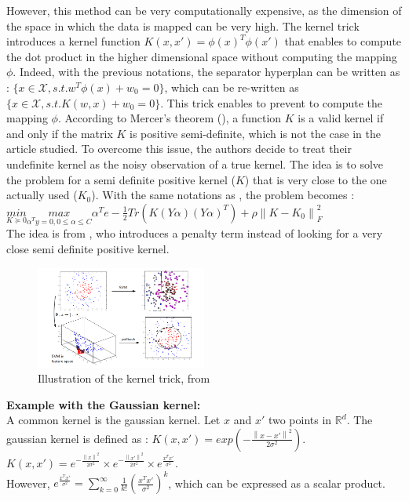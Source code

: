 \documentclass[a4paper,11pt]{article}
\begin{document}
However, this method can be very computationally expensive, as the dimension of the space in which the data is mapped can be very high.
The kernel trick introduces a kernel function $K(x, x') = \phi(x)^T \phi(x')$ that enables to compute the dot product in the higher dimensional space without computing the mapping $\phi$.
Indeed, with the previous notations, the separator hyperplan can be written as : $\{ x \in \mathcal{X}, s.t. w^T \phi(x) + w_0 =0  \} $, which can be re-written as $\{ x \in \mathcal{X}, s.t.  K(w, x) + w_0 = 0 \}$. 
This trick enables to prevent to compute the mapping $\phi$. 
According to Mercer's theorem (\cite{mercer1909xvi}), a function $K$ is a valid kernel if and only if the matrix $K$ is positive semi-definite, which is not the case in the article studied. 
To overcome this issue, the authors decide to treat their undefinite kernel as the noisy observation of a true kernel. 
The idea is to solve the problem for a semi definite positive kernel ($K$) that is very close to the one actually used ($K_0$).
With the same notations as \cite{lanckriet2004learning}, the problem becomes : \\

$  \underset{K \succeq 0 }{min } \underset{\alpha^T y = 0, 0 \leq \alpha \leq C}{max}  \alpha^T e - \frac{1}{2}  Tr(K(Y \alpha) (Y \alpha)^T) + \rho \left\lVert K - K_0\right\rVert _F ^2 $\\[0.3cm]
The idea is from \cite{luss2007support}, who introduces a penalty term instead of looking for a very close semi definite positive kernel.\\

\begin{figure}[h]
    \centering
    \includegraphics[width=0.5\textwidth]{figures/kernel_trick.png}
    \caption{Illustration of the kernel trick, from \cite{oudot2022cpp}}
\end{figure}

\textbf{Example with the Gaussian kernel: } \\

A common kernel is the gaussian kernel. 
Let $x$ and $x'$ two points in $\mathbb{R}^d$.
The gaussian kernel is defined as : $K(x, x') = exp(-\frac{\left\lVert x - x' \right\rVert ^2}{2\sigma^2})$.\\
$K(x, x') = e^{-\frac{\left\lVert x \right\rVert ^2}{2\sigma^2}} \times e^{-\frac{\left\lVert x' \right\rVert ^2}{2\sigma^2}} \times e^{ \frac{x^T x'}{\sigma^2}}$.\\
However, $e^{\frac{x^T x'}{\sigma^2}} = \sum_{k=0}^{\infty} \frac{1}{k!} \left( \frac{x^T x'}{\sigma^2} \right)^k$, which can be expressed as a scalar product. 
\end{document}
